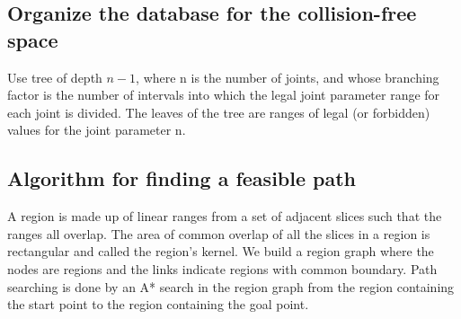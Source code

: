 \documentclass[12pt]{article}
\begin{document}
\subsection{Organize the database for the collision-free space}
Use tree of depth $n-1$, where n is the number of joints, and whose branching factor is the number of intervals into which the legal joint parameter range for each joint is divided.
The leaves of the tree are ranges of legal (or forbidden) values for the joint parameter n.
\subsection{Algorithm for finding a feasible path}
A region is made up of linear ranges from a set of adjacent slices such that the ranges all overlap.
The area of common overlap of all the slices in a region is rectangular and called the region's kernel.
We build a region graph where the nodes are regions and the links indicate regions with common boundary.
Path searching is done by an A* search in the region graph from the region containing the start point to the region containing the goal point.
\end{document}
